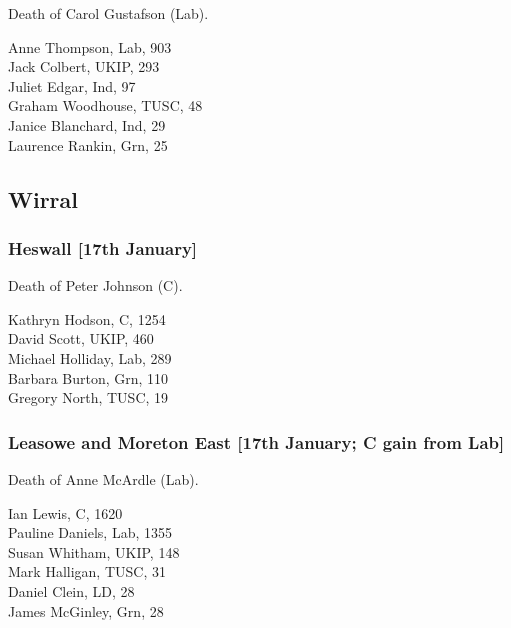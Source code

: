 \documentclass[a4paper,openany,10pt]{book}
\begin{document}

Death of Carol Gustafson (Lab).



Anne Thompson, Lab, 903\\
Jack Colbert, UKIP, 293\\
Juliet Edgar, Ind, 97\\
Graham Woodhouse, TUSC, 48\\
Janice Blanchard, Ind, 29\\
Laurence Rankin, Grn, 25\\


\subsection*{Wirral}

\subsubsection*{Heswall \hspace*{\fill}\nolinebreak[1]%
\enspace\hspace*{\fill}
[17th January]}


Death of Peter Johnson (C).



Kathryn Hodson, C, 1254\\
David Scott, UKIP, 460\\
Michael Holliday, Lab, 289\\
Barbara Burton, Grn, 110\\
Gregory North, TUSC, 19\\




\subsubsection*{Leasowe and Moreton East \hspace*{\fill}\nolinebreak[1]%
\enspace\hspace*{\fill}
[17th January; C gain from Lab]}


Death of Anne McArdle (Lab).



Ian Lewis, C, 1620\\
Pauline Daniels, Lab, 1355\\
Susan Whitham, UKIP, 148\\
Mark Halligan, TUSC, 31\\
Daniel Clein, LD, 28\\
James McGinley, Grn, 28\\
\end{document}
